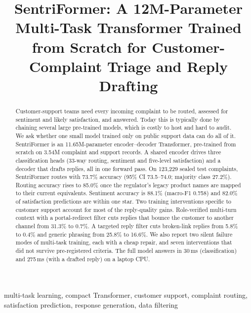 \documentclass[conference]{IEEEtran}
\begin{document}
\title{SentriFormer: A 12M-Parameter Multi-Task Transformer Trained from Scratch for Customer-Complaint Triage and Reply Drafting}

\author{
}

\maketitle

\begin{abstract}
Customer-support teams need every incoming complaint to be routed, assessed for sentiment and likely satisfaction, and answered. Today this is typically done by chaining several large pre-trained models, which is costly to host and hard to audit. We ask whether one small model trained only on public support data can do all of it. SentriFormer is an 11.65M-parameter encoder--decoder Transformer, pre-trained from scratch on 3.54M complaint and support records. A shared encoder drives three classification heads (33-way routing, sentiment and five-level satisfaction) and a decoder that drafts replies, all in one forward pass. On 123,229 sealed test complaints, SentriFormer routes with 73.7\% accuracy (95\% CI 73.5--74.0; majority class 27.2\%). Routing accuracy rises to 85.0\% once the regulator's legacy product names are mapped to their current equivalents. Sentiment accuracy is 88.1\% (macro-F1 0.758) and 82.0\% of satisfaction predictions are within one star. Two training interventions specific to customer support account for most of the reply-quality gains. Role-verified multi-turn context with a portal-redirect filter cuts replies that bounce the customer to another channel from 31.3\% to 0.7\%. A targeted reply filter cuts broken-link replies from 5.8\% to 0.4\% and generic phrasing from 25.8\% to 16.6\%. We also report two silent failure modes of multi-task training, each with a cheap repair, and seven interventions that did not survive pre-registered criteria. The full model answers in 30\,ms (classification) and 275\,ms (with a drafted reply) on a laptop CPU.
\end{abstract}

\begin{IEEEkeywords}
multi-task learning, compact Transformer, customer support, complaint routing, satisfaction prediction, response generation, data filtering
\end{IEEEkeywords}
\end{document}

